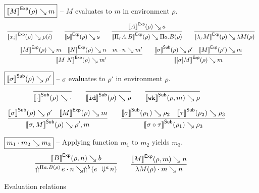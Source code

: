 \begin{figure}
  \raggedright
  \noindent
  $\boxed{{[\![M]\!]}^{\mathsf{Exp}}(\rho) \searrow m}$ -- $M$ evaluates to $m$ in environment $\rho$.
  \[
  \begin{array}{c}
    \infer{
      \evalexp {x_i} \rho {\rho(i)}
    }{
    }
    \qquad
    \infer{
      \evalexp {\tmcst s} \rho {\dcst s}
    }{
    }
    \qquad
    \infer{
      \evalexp {\tppi A B} \rho {\dpi a B \rho}
    }{
      \evalexp A \rho a
    }
    \qquad
    \infer{
      \evalexp {\tmlam M} \rho {\dlam M \rho}
    }{
    }
    \\[8pt]
    \infer{
      \evalexp {\tmapp M N} \rho {m'}
    }{
      \evalexp M \rho m
      &
      \evalexp N \rho n
      &
      \evalapp m n {m'}
    }
    \qquad
    \infer{
      \evalexp {\tmclo \sigma M} \rho m
    }{
      \evalsub \sigma \rho {\rho'}
      &
      \evalexp M {\rho'} m
    }
  \end{array}
  \]

  \noindent
  $\boxed{{[\![\sigma]\!]}^{\mathsf{Sub}}(\rho) \searrow \rho'}$ -- $\sigma$ evaluates to $\rho'$ in environment $\rho$.
  \[
  \begin{array}{c}
    \infer{
      \evalsub \subempty \rho \denvempty
    }{
    }
    \qquad
    \infer{
      \evalsub \subid \rho \rho
    }{
    }
    \qquad
    \infer{
      \evalsub \subwk {\rho, m} \rho
    }{
    }
    \\[8pt]
    \infer{
      \evalsub {\subext \sigma M} \rho {\rho', m}
    }{
      \evalsub \sigma \rho {\rho'}
      &
      \evalexp M \rho m
    }
    \qquad
    \infer{
      \evalsub {\subclo \sigma \tau} {\rho_1} {\rho_3}
    }{
      \evalsub \sigma {\rho_1} {\rho_2}
      &
      \evalsub \tau {\rho_2} {\rho_3}
    }
  \end{array}
  \]

  \noindent
  $\boxed{m_1 \cdot m_2 \searrow m_3}$ -- Applying function $m_1$ to $m_2$ yields $m_3$.
  \[
  \begin{array}{c}
    \infer{
      \evalapp {\dreflect {\dpi a B \rho} e} n {\dreflect b {(\dapp e {\dreify a n})}}
    }{
      \evalexp B {\rho, n} b
    }
    \qquad
    \infer{
      \evalapp {\dlam M \rho} m n
    }{
      \evalexp M {\rho, m} n
    }
  \end{array}
  \]
  \caption{Evaluation relations}
  \label{fig:eval}
\end{figure}
